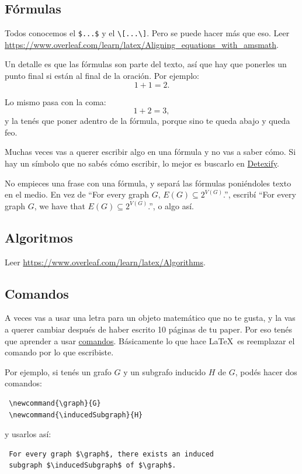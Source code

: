 \documentclass{article}
\begin{document}
\subsection{Fórmulas}
Todos conocemos el \verb|$...$| y el \verb|\[...\]|. Pero se puede hacer más que eso. Leer \url{https://www.overleaf.com/learn/latex/Aligning_equations_with_amsmath}.

Un detalle es que las fórmulas son parte del texto, así que hay que ponerles un punto final si están al final de la oración. Por ejemplo:
\[1+1=2.\]

Lo mismo pasa con la coma:
\[1+2=3,\]
y la tenés que poner adentro de la fórmula, porque sino te queda abajo y queda feo.

Muchas veces vas a querer escribir algo en una fórmula y no vas a saber cómo. Si hay un símbolo que no sabés cómo escribir, lo mejor es buscarlo en \href{https://detexify.kirelabs.org/}{Detexify}.

No empieces una frase con una fórmula, y separá las fórmulas poniéndoles texto en el medio. En vez de  ``For every graph $G$, $E(G) \subseteq 2^{V(G)}$.'', escribí ``For every graph $G$, we have that $E(G) \subseteq 2^{V(G)}$.'', o algo así.


\subsection{Algoritmos}
Leer \url{https://www.overleaf.com/learn/latex/Algorithms}.

\subsection{Comandos}
A veces vas a usar una letra para un objeto matemático que no te gusta, y la vas a querer cambiar después de haber escrito 10 páginas de tu paper. Por eso tenés que aprender a usar \href{https://www.overleaf.com/learn/latex/Commands}{comandos}. Básicamente lo que hace \LaTeX\ es reemplazar el comando por lo que escribiste.

Por ejemplo, si tenés un grafo $G$ y un subgrafo inducido $H$ de $G$, podés hacer dos comandos:
\begin{verbatim}
 \newcommand{\graph}{G}
 \newcommand{\inducedSubgraph}{H}
\end{verbatim}

y usarlos así:
\begin{verbatim}
 For every graph $\graph$, there exists an induced
 subgraph $\inducedSubgraph$ of $\graph$.
\end{verbatim}
\end{document}
